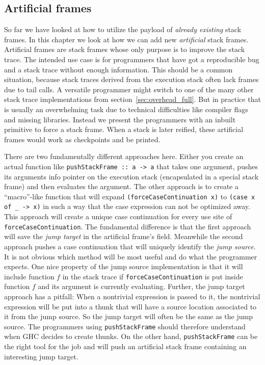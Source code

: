 \subsection{Artificial frames} \label{sec:artificial_frames}

So far we have looked at how to utilize the payload of \emph{already existing} stack
frames. In this chapter we look at how we can add new \emph{artificial}
stack frames.
Artificial frames are stack frames whose only purpose is to improve
the stack trace. The intended use case is for programmers that have
got a reproducible bug and a stack trace without enough information.
This should be a common situation, because stack traces derived from the
execution stack often lack frames due to tail calls. A versatile
programmer might switch to one of the many other stack trace
implementations from section~\ref{sec:overhead_full}.
But in practice that is usually an overwhelming task
due to technical difficulties like compiler flags and missing libraries. Instead we present
the programmers with an inbuilt primitive to force a stack frame.
When a stack is later reified, these artificial frames would work as
checkpoints and be printed.

There are two fundamentally different approaches here. Either you create
an actual function like \texttt{pushStackFrame :: a -> a} that takes
one argument, pushes its arguments info pointer on the execution stack
(encapsulated in a special stack frame) and then evaluates the argument.
The other approach is to create a ``macro''-like function that will
expand \texttt{(forceCaseContinuation x)} to \texttt{(case x of \_ ->
x)} in such a way that the case expression can not be optimized away.
This approach will create a unique case continuation for every use site
of \texttt{forceCaseContinuation}. The fundamental difference is that
the first approach will save the \emph{jump target} in the artificial
frame's field. Meanwhile the second approach pushes a case continuation
that will uniquely identify the \emph{jump source}. It is not obvious
which method will be most useful and do what the programmer expects. One
nice property of the jump source implementation is that it will include
function $f$ in the stack trace if \texttt{forceCaseContinuation} is
put inside function $f$ and its argument is currently evaluating.
Further, the jump target approach has a pitfall: When a nontrivial
expression is passed to it, the nontrivial expression will be put into
a thunk that will have a source location associated to it from the jump
source. So the jump target will often be the same as
the jump source. The programmers using \texttt{pushStackFrame} should
therefore understand when GHC decides to create thunks. On the other
hand, \texttt{pushStackFrame} can be the right tool for the job and will
push an artificial stack frame containing an interesting jump target.

